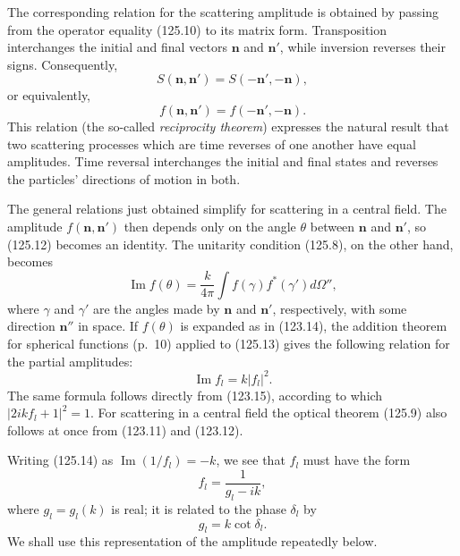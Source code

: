 The corresponding relation for the scattering amplitude is obtained by
passing from the operator equality (125.10) to its matrix form. Transposition
interchanges the initial and final vectors $\mathbf n$ and $\mathbf n'$, while
inversion reverses their signs. Consequently,
\begin{equation}
 S(\mathbf n,\mathbf n')=S(-\mathbf n',-\mathbf n),
 \tag{125.11}
\end{equation}
or equivalently,
\begin{equation}
 f(\mathbf n,\mathbf n')=f(-\mathbf n',-\mathbf n).
 \tag{125.12}
\end{equation}
This relation (the so-called \emph{reciprocity theorem}) expresses the natural
result that two scattering processes which are time reverses of one another
have equal amplitudes. Time reversal interchanges the initial and final states
and reverses the particles' directions of motion in both.

The general relations just obtained simplify for scattering in a central
field. The amplitude $f(\mathbf n,\mathbf n')$ then depends only on the angle
$\theta$ between $\mathbf n$ and $\mathbf n'$, so (125.12) becomes an
identity. The unitarity condition (125.8), on the other hand, becomes
\begin{equation}
 \operatorname{Im}f(\theta)=\frac{k}{4\pi}
 \int f(\gamma)f^*(\gamma')d\Omega'',
 \tag{125.13}
\end{equation}
where $\gamma$ and $\gamma'$ are the angles made by $\mathbf n$ and
$\mathbf n'$, respectively, with some direction $\mathbf n''$ in space. If
$f(\theta)$ is expanded as in (123.14), the addition theorem for spherical
functions (p.~10) applied to (125.13) gives the following relation for the
partial amplitudes:
\begin{equation}
 \operatorname{Im}f_l=k|f_l|^2.
 \tag{125.14}
\end{equation}
The same formula follows directly from (123.15), according to which
$|2ikf_l+1|^2=1$. For scattering in a central field the optical theorem
(125.9) also follows at once from (123.11) and (123.12).

Writing (125.14) as $\operatorname{Im}(1/f_l)=-k$, we see that $f_l$ must have
the form
\begin{equation}
 f_l=\frac1{g_l-ik},
 \tag{125.15}
\end{equation}
where $g_l=g_l(k)$ is real; it is related to the phase $\delta_l$ by
\begin{equation}
 g_l=k\cot\delta_l.
 \tag{125.16}
\end{equation}
We shall use this representation of the amplitude repeatedly below.


